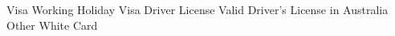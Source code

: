 

\begin{cvskills}
  \cvskill
    {Visa} %
    {Working Holiday Visa}
  \cvskill
    {Driver License} %
    {Valid Driver's License in Australia} %
   \cvskill
    {Other} %
    {White Card} %


\end{cvskills}
